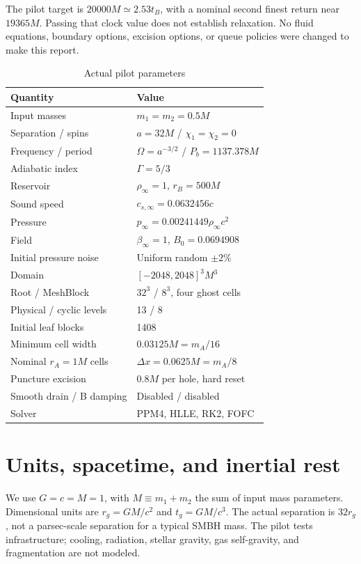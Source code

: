 \documentclass[twocolumn,anonymous]{aastex701}
\begin{document}
The pilot target is $20000M\simeq2.53t_B$, with a nominal second finest return near $19365M$. Passing that clock value does not establish relaxation. No fluid equations, boundary options, excision options, or queue policies were changed to make this report.

\begin{table}[t]
\centering\small\setlength{\tabcolsep}{3pt}\caption{Actual pilot parameters}\label{tab:params}
\begin{tabular}{ll}\toprule
Quantity & Value \\\midrule
Input masses & $m_1=m_2=0.5M$\\
Separation / spins & $a=32M$ / $\chi_1=\chi_2=0$\\
Frequency / period & $\Omega=a^{-3/2}$ / $P_b=1137.378M$\\
Adiabatic index & $\Gamma=5/3$\\
Reservoir & $\rho_\infty=1$, $r_B=500M$\\
Sound speed & $c_{s,\infty}=0.0632456c$\\
Pressure & $p_\infty=0.00241449\rho_\infty c^2$\\
Field & $\beta_\infty=1$, $B_0=0.0694908$\\
Initial pressure noise & Uniform random $\pm2\%$\\
Domain & $[-2048,2048]^3M^3$\\
Root / MeshBlock & $32^3$ / $8^3$, four ghost cells\\
Physical / cyclic levels & 13 / 8\\
Initial leaf blocks & 1408\\
Minimum cell width & $0.03125M=m_A/16$\\
Nominal $r_A=1M$ cells & $\Delta x=0.0625M=m_A/8$\\
Puncture excision & $0.8M$ per hole, hard reset\\
Smooth drain / B damping & Disabled / disabled\\
Solver & PPM4, HLLE, RK2, FOFC\\
\bottomrule\end{tabular}
\end{table}

\section{Units, spacetime, and inertial rest}
We use $G=c=M=1$, with $M\equiv m_1+m_2$ the sum of input mass parameters. Dimensional units are $r_g=GM/c^2$ and $t_g=GM/c^3$. The actual separation is $32r_g$, not a parsec-scale separation for a typical SMBH mass. The pilot tests infrastructure; cooling, radiation, stellar gravity, gas self-gravity, and fragmentation are not modeled.
\end{document}
